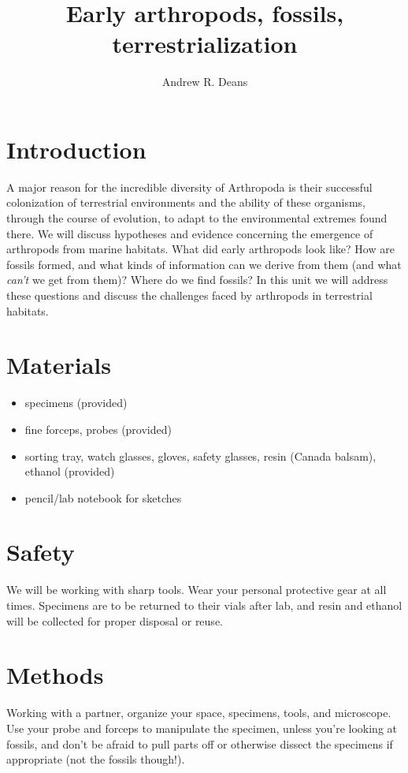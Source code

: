 \documentclass[letterpaper, 11pt]{article}
\title{Early arthropods, fossils, terrestrialization}
\author{Andrew R. Deans}
\begin{document}
\cleanlookdateon %
\maketitle
\thispagestyle{fancy}

\section*{Introduction}
A major reason for the incredible diversity of Arthropoda is their successful colonization of terrestrial environments and the ability of these organisms, through the course of evolution, to adapt to the environmental extremes found there. We will discuss hypotheses and evidence concerning the emergence of arthropods from marine habitats. What did early arthropods look like? How are fossils formed, and what kinds of information can we derive from them (and what \textit{can't} we get from them)? Where do we find fossils? In this unit we will address these questions and discuss the challenges faced by arthropods in terrestrial habitats.

\section*{Materials}

\begin{itemize}
\item specimens (provided)
\item fine forceps, probes (provided)
\item sorting tray, watch glasses, gloves, safety glasses, resin (Canada balsam), ethanol (provided)
\item pencil/lab notebook for sketches
\end{itemize}

\section*{Safety}
We will be working with sharp tools. Wear your personal protective gear at all times. Specimens are to be returned to their vials after lab, and resin and ethanol will be collected for proper disposal or reuse.

\section*{Methods}
Working with a partner, organize your space, specimens, tools, and microscope. Use your probe and forceps to manipulate the specimen, unless you're looking at fossils, and don't be afraid to pull parts off or otherwise dissect the specimens if appropriate (not the fossils though!).
\end{document}
